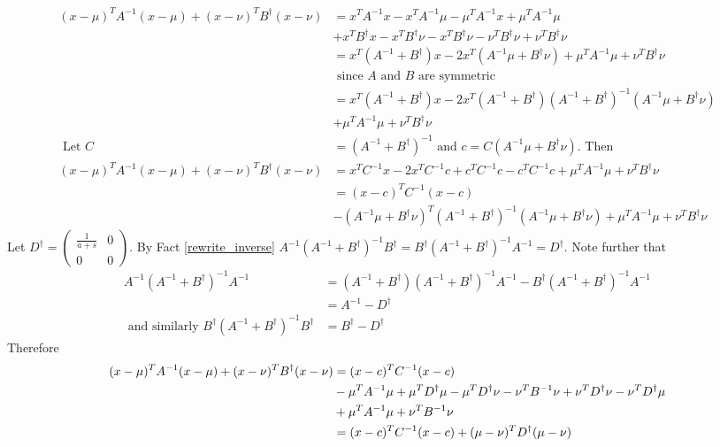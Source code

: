 \documentclass{article}
\begin{document}
\begin{pf}
\begin{align*}
(x-\mu)^TA^{-1}(x-\mu)+(x-\nu)^TB^{\dagger}(x-\nu)
&=x^TA^{-1}x-x^TA^{-1}\mu-\mu^TA^{-1}x+\mu^TA^{-1}\mu
\\&+x^TB^{\dagger}x-x^TB^{\dagger}\nu-x^TB^{\dagger}\nu-\nu^TB^{\dagger}\nu+\nu^TB^{\dagger}\nu
\\&=x^T(A^{-1}+B^{\dagger})x-2x^T(A^{-1}\mu+B^{\dagger}\nu)+\mu^TA^{-1}\mu+\nu^TB^{\dagger}\nu 
\\ &\text{ since $A$ and $B$ are symmetric}
\\&=x^T(A^{-1}+B^{\dagger})x-2x^T(A^{-1}+B^{\dagger})(A^{-1}+B^{\dagger})^{-1}(A^{-1}\mu+B^{\dagger}\nu)
\\&+\mu^TA^{-1}\mu+\nu^TB^{\dagger}\nu 
\\ \text{ Let } C&=(A^{-1}+B^{\dagger})^{-1}\text{ and $c=C(A^{-1}\mu+B^{\dagger}\nu)$. Then }
\\(x-\mu)^TA^{-1}(x-\mu)+(x-\nu)^TB^{\dagger}(x-\nu)&=x^TC^{-1}x-2x^TC^{-1}c+c^TC^{-1}c-c^TC^{-1}c+\mu^TA^{-1}\mu+\nu^TB^{\dagger}\nu
\\&=(x-c)^TC^{-1}(x-c)
\\&-(A^{-1}\mu+B^{\dagger}\nu)^T(A^{-1}+B^{\dagger}) ^{-1}(A^{-1}\mu+B^{\dagger}\nu)+\mu^TA^{-1}\mu+\nu^TB^{\dagger}\nu
\end{align*}
Let $D^\dagger=\left(\begin{array}{cc} \frac{1}{a+s} & 0 \\ 0 & 0 \end{array} \right)$. By Fact \ref{rewrite_inverse} $A^{-1}(A^{-1}+B^{\dagger})^{-1}B^{\dagger}=B^{\dagger}(A^{-1}+B^{\dagger})^{-1}A^{-1}=D^\dagger$. Note further that 
\begin{align*}
A^{-1}(A^{-1}+B^{\dagger})^{-1}A^{-1}&=(A^{-1}+B^{\dagger})(A^{-1}+B^{\dagger})^{-1}A^{-1}-B^{\dagger}(A^{-1}+B^{\dagger})^{-1}A^{-1}
\\&=A^{-1}-D^\dagger
\\\text{ and similarly } B^{\dagger}(A^{-1}+B^{\dagger})^{-1}B^{\dagger} &=B^{\dagger}-D^\dagger
\end{align*}
Therefore 
\begin{align}
(x-\mu)^TA^{-1}(x-\mu)+(x-\nu)^TB^{\dagger}(x-\nu)&=(x-c)^TC^{-1}(x-c) \notag
\\&-\mu^TA^{-1}\mu+\mu^TD^\dagger\mu-\mu^TD^\dagger\nu-\nu^TB^{-1}\nu+\nu^TD^\dagger\nu-\nu^TD^\dagger\mu \notag
\\&+\mu^TA^{-1}\mu+\nu^TB^{-1}\nu \notag
\\&=(x-c)^TC^{-1}(x-c)+(\mu-\nu)^TD^\dagger(\mu-\nu) \notag

\end{align}
\end{pf}
\end{document}
